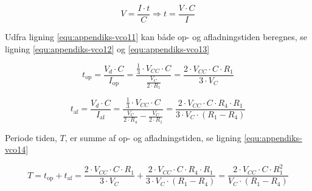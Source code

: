 \begin{equation}
\label{equ:appendiks-vco11}
V = \frac{I \cdot t}{C} \Rightarrow t = \frac{V \cdot C}{I}
\end{equation}

Udfra ligning \ref{equ:appendiks-vco11} kan både op- og afladningstiden beregnes, se ligning \ref{equ:appendiks-vco12} og \ref{equ:appendiks-vco13}

\begin{equation}
\label{equ:appendiks-vco12}
t_{\mathrm{op}} = \frac{V_d \cdot C}{I_{\mathrm{op}}} = \frac{\frac{1}{3} \cdot V_{CC} \cdot C}{\frac{V_C}{2 \cdot R_1}} = \frac{2 \cdot V_{CC} \cdot C \cdot R_1}{3 \cdot V_C}
\end{equation}

\begin{equation}
\label{equ:appendiks-vco13}
t_{\mathrm{af}} = \frac{V_d \cdot C}{I_{\mathrm{af}}} = \frac{\frac{1}{3} \cdot V_{CC} \cdot C}{\frac{V_C}{2 \cdot R_4} - \frac{V_C}{2 \cdot R_1}} = \frac{2 \cdot V_{CC} \cdot C \cdot R_4 \cdot R_1}{3 \cdot V_C \cdot (R_1 - R_4)}
\end{equation}

Periode tiden, $T$, er summe af op- og afladningstiden, se ligning \ref{equ:appendiks-vco14}

\begin{equation}
\label{equ:appendiks-vco14}
T = t_{\mathrm{op}} + t_{\mathrm{af}} = \frac{2 \cdot V_{CC} \cdot C \cdot R_1}{3 \cdot V_C} + \frac{2 \cdot V_{CC} \cdot C \cdot R_4 \cdot R_1}{3 \cdot V_C \cdot (R_1 - R_4)} = \frac{2 \cdot V_{CC} \cdot C \cdot R_1^2}{V_C \cdot (R_1 - R_4)}
\end{equation}